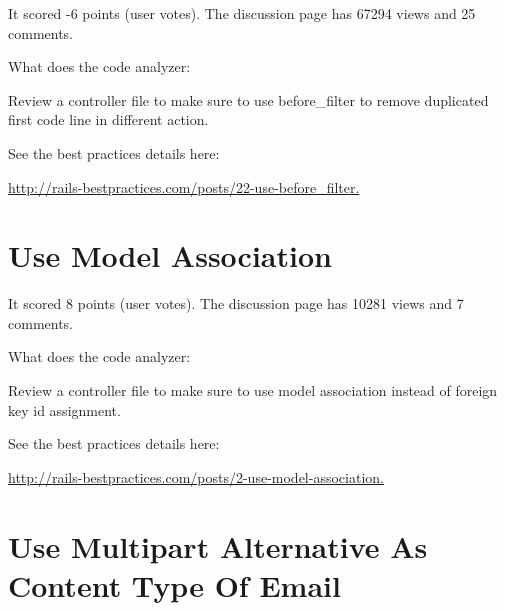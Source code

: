 
It scored -6 points (user votes). 
The discussion page has 67294 views and 25 comments.

What does the code analyzer:

Review a controller file to make sure to use before\_filter to remove duplicated first code line in different action.

See the best practices details here:
 
\url{http://rails-bestpractices.com/posts/22-use-before_filter.}

\section{Use Model Association}


It scored 8 points (user votes). 
The discussion page has 10281 views and 7 comments.

What does the code analyzer:

Review a controller file to make sure to use model association instead of foreign key id assignment.

See the best practices details here:
 
\url{http://rails-bestpractices.com/posts/2-use-model-association.}

\section{Use Multipart Alternative As Content Type Of Email}


